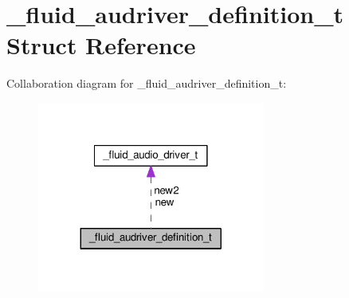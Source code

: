 \hypertarget{struct__fluid__audriver__definition__t}{}\section{\+\_\+fluid\+\_\+audriver\+\_\+definition\+\_\+t Struct Reference}
\label{struct__fluid__audriver__definition__t}


Collaboration diagram for \+\_\+fluid\+\_\+audriver\+\_\+definition\+\_\+t\+:
\nopagebreak
\begin{figure}[H]
\begin{center}
\leavevmode
\includegraphics[width=212pt]{struct__fluid__audriver__definition__t__coll__graph}
\end{center}
\end{figure}

